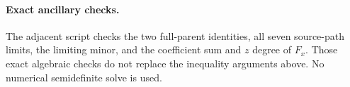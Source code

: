 \documentclass[11pt]{article}
\begin{document}
\paragraph{Exact ancillary checks.}
The adjacent script checks the two full-parent identities, all seven
source-path limits, the limiting minor, and the coefficient sum and
$z$ degree of $F_x$. Those exact algebraic checks do not replace the
inequality arguments above. No numerical semidefinite solve is used.
\end{document}
